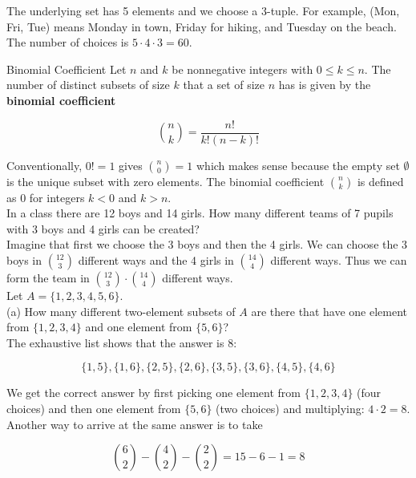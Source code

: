         The underlying set has 5 elements and we choose a 3-tuple. For example, (Mon, Fri, Tue) means Monday in town, Friday for hiking, and Tuesday on the beach. The number of choices is $5\cdot 4 \cdot 3 = 60$. \\

        \begin{theorem}{Binomial Coefficient}
            Let $n$ and $k$ be nonnegative integers with $0\leq k \leq n$. The number of distinct subsets of size $k$ that a set of size $n$ has is given by the \textbf{binomial coefficient}

            \[
                \binom{n}{k} = \frac{n!}{k!(n-k)!}
            \]
        \end{theorem}

        Conventionally, $0! = 1$ gives $\binom{n}{0} = 1$ which makes sense because the empty set $\emptyset$ is the unique subset with zero elements. The binomial coefficient $\binom{n}{k}$ is defined as 0 for integers
        $k < 0$ and $k > n$. \\

        \textit{} In a class there are 12 boys and 14 girls. How many different teams of 7 pupils with 3 boys and 4 girls can be created? \\

        Imagine that first we choose the 3 boys and then the 4 girls. We can choose the 3 boys in $\binom{12}{3}$ different ways and the 4 girls in $\binom{14}{4}$ different ways. Thus we can form the team in
        $\binom{12}{3}\cdot \binom{14}{4}$ different ways. \\

        \textit{} Let $A=\{1,2,3,4,5,6\}$. \\
        (a) How many different two-element subsets of $A$ are there that have one element from $\{1,2,3,4\}$ and one element from $\{5,6\}$? \\

        The exhaustive list shows that the answer is 8:

        \[
            \{1,5\}, \{1,6\}, \{2,5\},\{2,6\},\{3,5\},\{3,6\},\{4,5\},\{4,6\}
        \]

        We get the correct answer by first picking one element from $\{1,2,3,4\}$ (four choices) and then one element from $\{5,6\}$ (two choices) and multiplying: $4\cdot 2 = 8$. Another way to arrive at the same answer
        is to take

        \[
            \binom{6}{2} - \binom{4}{2} - \binom{2}{2} = 15 - 6 - 1 = 8
        \]

